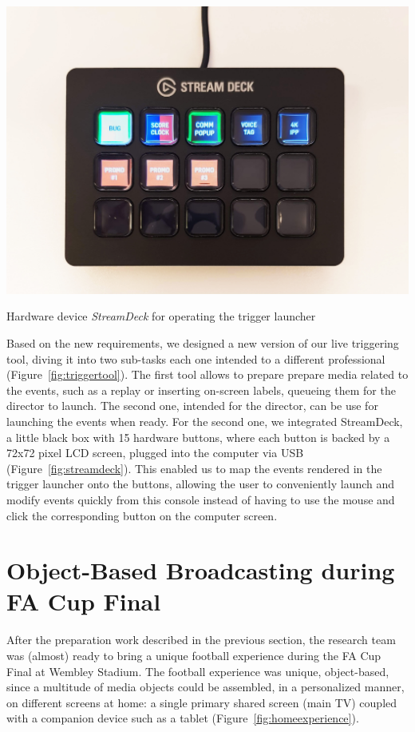 \documentclass[sigchi-a, authorversion]{acmart}
\begin{document}
\begin{marginfigure}
    \includegraphics[width=\marginparwidth-10pt]{Figures/streamdeck.jpg}
    \caption{Hardware device \emph{StreamDeck} for operating the trigger launcher}
    \label{fig:streamdeck}
\end{marginfigure}

Based on the new requirements, we designed a new version of our live triggering tool, diving it into two sub-tasks each one intended to a different professional (Figure~\ref{fig:triggertool}). The first tool allows to prepare prepare media related to the events, such as a replay or inserting on-screen labels, queueing them for the director to launch. The second one, intended for the director, can be use for launching the events when ready. For the second one, we integrated StreamDeck, a little black box with 15 hardware buttons, where each button is backed by a 72x72 pixel LCD screen, plugged into the computer via USB (Figure~\ref{fig:streamdeck}). This enabled us to map the events rendered in the trigger launcher onto the buttons, allowing the user to conveniently launch and modify events quickly from this console instead of having to use the mouse and click the corresponding button on the computer screen.

\section{Object-Based Broadcasting during FA Cup Final}
After the preparation work described in the previous section, the research team was (almost) ready to bring a unique football experience during the FA Cup Final at Wembley Stadium. The football experience was unique, object-based, since a multitude of media objects could be assembled, in a personalized manner, on different screens at home: a single primary shared screen (main TV) coupled with a companion device such as a tablet (Figure~\ref{fig:homeexperience}).
\end{document}
